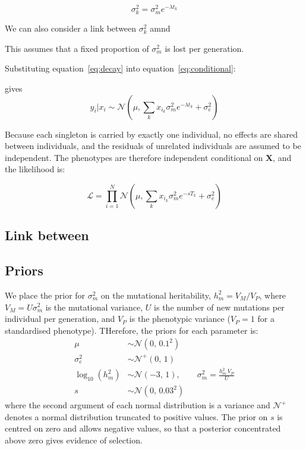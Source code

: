 \documentclass{article}
\begin{document}
\begin{equation}
    \sigma_{k}^2 = \sigma_{m}^{2} e^{-\lambda{t_{k}}}
    \label{eq:decay}
\end{equation}

We can also consider a link between $\sigma_k^2$ amnd

This assumes that a fixed proportion of $\sigma_{m}^2$ is lost per generation.

Substituting equation~\eqref{eq:decay} into equation~\eqref{eq:conditional}:

gives
\begin{equation}
    y_{i} | x_{i} \sim \mathcal{N}( \mu, \sum_{k} x_{i_k} \sigma_{m}^{2} e^{-\lambda{t_{k}}} + \sigma_{e}^{2})
\end{equation}

Because each singleton is carried by exactly one individual, no effects are shared between individuals, and the residuals of unrelated individuals are assumed to be independent. The phenotypes are therefore independent conditional on $\mathbf{X}$, and the likelihood is:

\begin{equation}
    \mathcal{L} = \prod_{i=1}^{N} \mathcal{N}( \mu, \sum_{k} x_{i_k} \sigma_{m}^{2} e^{-sT_{k}} + \sigma_{e}^{2})
\end{equation}

\subsection{Link between }

\subsection{Priors}

We place the prior for $\sigma_m^2$ on the mutational heritability,
$h_m^2 = V_M / V_P$, where $V_M = U \sigma_m^2$ is the mutational variance, $U$
is the number of new mutations per individual per generation, and $V_P$ is the
phenotypic variance ($V_P = 1$ for a standardised phenotype). THerefore, the priors for each parameter is:
\begin{align}
    \mu &\sim \mathcal{N}(0,\, 0.1^2) \\
    \sigma_e^2 &\sim \mathcal{N}^{+}(0,\, 1) \\
    \log_{10}(h_m^2) &\sim \mathcal{N}(-3,\, 1),
        \qquad \sigma_m^2 = \frac{h_m^2\, V_P}{U} \\
    s &\sim \mathcal{N}(0,\, 0.03^2)
\end{align}
where the second argument of each normal distribution is a variance and
$\mathcal{N}^{+}$ denotes a normal distribution truncated to positive values.
The prior on $s$ is centred on zero and allows negative values, so that a posterior concentrated above zero gives evidence of selection.
\end{document}
